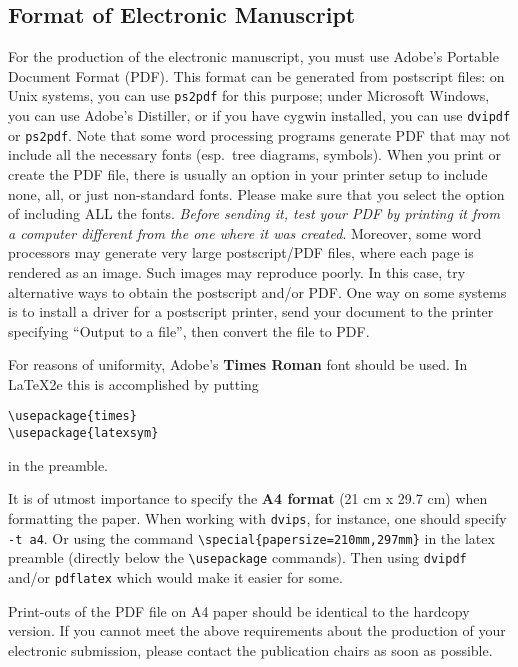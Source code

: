 \subsection{Format of Electronic Manuscript}
\label{sect:pdf}

For the production of the electronic manuscript, you must use Adobe's
Portable Document Format (PDF). This format can be generated from
postscript files: on Unix systems, you can use {\small\tt ps2pdf} for this
purpose; under Microsoft Windows, you can use Adobe's Distiller, or
if you have cygwin installed, you can use {\small\tt dvipdf} or
{\small\tt ps2pdf}.  Note 
that some word processing programs generate PDF that may not include
all the necessary fonts (esp.\ tree diagrams, symbols). When you print
or create the PDF file, there is usually an option in your printer
setup to include none, all, or just non-standard fonts.  Please make
sure that you select the option of including ALL the fonts.  {\em Before
sending it, test your {\/\em PDF} by printing it from a computer different
from the one where it was created}. Moreover, some word processors may
generate very large postscript/PDF files, where each page is rendered as
an image. Such images may reproduce poorly.  In this case, try alternative
ways to obtain the postscript and/or PDF.  One way on some systems is to
install a driver for a postscript printer, send your document to the
printer specifying ``Output to a file'', then convert the file to PDF.

For reasons of uniformity, Adobe's {\bf Times Roman} font should be
used. In \LaTeX2e{} this is accomplished by putting

\small
\begin{verbatim}
\usepackage{times}
\usepackage{latexsym}
\end{verbatim}
\normalsize
in the preamble.

It is of utmost importance to specify the \textbf{A4 format} (21 cm
x 29.7 cm) when formatting the paper. When working with
{\tt dvips}, for instance, one should specify {\tt -t a4}.
Or using the command \verb|\special{papersize=210mm,297mm}| in the latex
preamble (directly below the \verb|\usepackage| commands). Then using 
{\tt dvipdf} and/or {\tt pdflatex} which would make it easier for some.

Print-outs of the PDF file on A4 paper should be identical to the
hardcopy version. If you cannot meet the above requirements about the
production of your electronic submission, please contact the
publication chairs as soon as possible.

